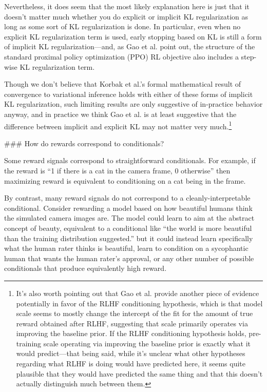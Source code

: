 {Nevertheless, it does seem that the most likely explanation here is just that it doesn't matter much whether you do explicit or implicit KL regularization as long as some sort of KL regularization is done. In particular, even when no explicit KL regularization term is used, early stopping based on KL is still a form of implicit KL regularization---and, as Gao et al. point out, the structure of the standard proximal policy optimization (PPO) RL objective also includes a step-wise KL regularization term.

Though we don't believe that Korbak et al.'s formal mathematical result of convergence to variational inference holds with either of these forms of implicit KL regularization, such limiting results are only suggestive of in-practice behavior anyway, and in practice we think Gao et al. is at least suggestive that the difference between implicit and explicit KL may not matter very much.\footnote{It's also worth pointing out that Gao et al. provide another piece of evidence potentially in favor of the RLHF conditioning hypothesis, which is that model scale seems to mostly change the intercept of the fit for the amount of true reward obtained after RLHF, suggesting that scale primarily operates via improving the baseline prior. If the RLHF conditioning hypothesis holds, pre-training scale operating via improving the baseline prior is exactly what it would predict---that being said, while it's unclear what other hypotheses regarding what RLHF is doing would have predicted here, it seems quite plausible that they would have predicted the same thing and that this doesn't actually distinguish much between them.}


### How do rewards correspond to conditionals?

Some reward signals correspond to straightforward conditionals. For example, if the reward is ``1 if there is a cat in the camera frame, 0 otherwise'' then maximizing reward is equivalent to conditioning on a cat being in the frame.

By contrast, many reward signals do not correspond to a cleanly-interpretable conditional. Consider rewarding a model based on how beautiful humans think the simulated camera images are. The model could learn to aim at the abstract concept of beauty, equivalent to a conditional like ``the world is more beautiful than the training distribution suggested.'' but it could instead learn specifically what the human rater thinks is beautiful, learn to condition on a sycophantic human that wants the human rater's approval, or any other number of possible conditionals that produce equivalently high reward.

}
